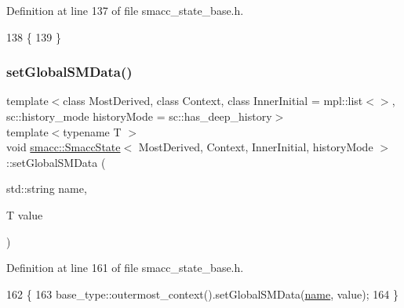 Definition at line 137 of file smacc\+\_\+state\+\_\+base.\+h.


\begin{DoxyCode}
138   \{
139   \}
\end{DoxyCode}
\mbox{\label{classsmacc_1_1SmaccState_a98f2673b257479e0a3615d5d8279a591}} 
\subsubsection{\texorpdfstring{set\+Global\+S\+M\+Data()}{setGlobalSMData()}}
{\footnotesize\ttfamily template$<$class Most\+Derived, class Context, class Inner\+Initial = mpl\+::list$<$$>$, sc\+::history\+\_\+mode history\+Mode = sc\+::has\+\_\+deep\+\_\+history$>$ \\
template$<$typename T $>$ \\
void \hyperlink{classsmacc_1_1SmaccState}{smacc\+::\+Smacc\+State}$<$ Most\+Derived, Context, Inner\+Initial, history\+Mode $>$\+::set\+Global\+S\+M\+Data (\begin{DoxyParamCaption}\item[{std\+::string}]{name,  }\item[{T}]{value }\end{DoxyParamCaption})\hspace{0.3cm}{\ttfamily [inline]}}



Definition at line 161 of file smacc\+\_\+state\+\_\+base.\+h.


\begin{DoxyCode}
162   \{
163     base\_type::outermost\_context().setGlobalSMData(\hyperlink{namespaceinteractive__marker_a447655961b3d3ca3c5a2a9d3d769436d}{name}, value);
164   \}
\end{DoxyCode}
\mbox{\label{classsmacc_1_1SmaccState_a1dccb401e1a99031863a21a590d953e6}} 
